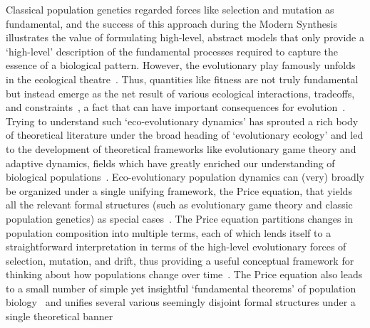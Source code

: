 Classical population genetics regarded forces like selection and mutation as fundamental, and the success of this approach during the Modern Synthesis illustrates the value of formulating high-level, abstract models that only provide a `high-level' description of the fundamental processes required to capture the essence of a biological pattern. However, the evolutionary play famously unfolds in the ecological theatre~\citep{hutchinson_ecological_1965}. Thus, quantities like fitness are not truly fundamental but instead emerge as the net result of various ecological interactions, tradeoffs, and constraints~\citep{metz_how_1992}, a fact that can have important consequences for evolution~\citep{coulson_putting_2006, kokko_can_2017}. Trying to understand such `eco-evolutionary dynamics' has sprouted a rich body of theoretical literature under the broad heading of `evolutionary ecology' and led to the development of theoretical frameworks like evolutionary game theory and adaptive dynamics, fields which have greatly enriched our understanding of biological populations~\citep{brown_why_2016}. Eco-evolutionary population dynamics can (very) broadly be organized under a single unifying framework, the Price equation, that yields all the relevant formal structures (such as evolutionary game theory and classic population genetics) as special cases~\citep{page_unifying_2002, queller_fundamental_2017, lion_theoretical_2018}. The Price equation partitions changes in population composition into multiple terms, each of which lends itself to a straightforward interpretation in terms of the high-level evolutionary forces of selection, mutation, and drift, thus providing a useful conceptual framework for thinking about how populations change over time~\citep{frank_natural_2012}. The Price equation also leads to a small number of simple yet insightful `fundamental theorems' of population biology~\citep{queller_fundamental_2017, lion_theoretical_2018, lehtonen_price_2018} and unifies several various seemingly disjoint formal structures under a single theoretical banner~\citep{ lehtonen_price_2020, luque_mirror_2021}


